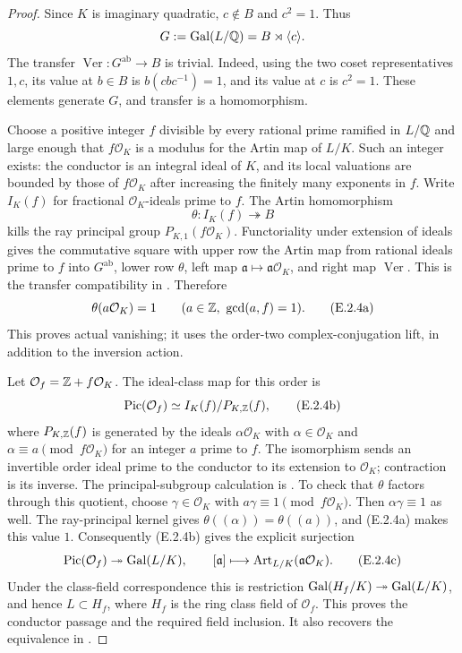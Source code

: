 \begin{proof}
Since $K$ is imaginary quadratic, $c\notin B$ and $c^2=1$. Thus
\[
 G:=\operatorname{Gal}(L/\mathbb Q)=B\rtimes\langle c\rangle.
\]
The transfer $\operatorname{Ver}:G^{\mathrm{ab}}\to B$ is trivial. Indeed, using the two coset representatives $1,c$, its value at $b\in B$ is $b(cbc^{-1})=1$, and its value at $c$ is $c^2=1$. These elements generate $G$, and transfer is a homomorphism.

Choose a positive integer $f$ divisible by every rational prime ramified in $L/\mathbb Q$ and large enough that $f\mathcal O_K$ is a modulus for the Artin map of $L/K$. Such an integer exists: the conductor is an integral ideal of $K$, and its local valuations are bounded by those of $f\mathcal O_K$ after increasing the finitely many exponents in $f$. Write $I_K(f)$ for fractional $\mathcal O_K$-ideals prime to $f$. The Artin homomorphism
\[
 \theta:I_K(f)\twoheadrightarrow B
\]
kills the ray principal group $P_{K,1}(f\mathcal O_K)$. Functoriality under extension of ideals gives the commutative square with upper row the Artin map from rational ideals prime to $f$ into $G^{\mathrm{ab}}$, lower row $\theta$, left map $\mathfrak a\mapsto\mathfrak a\mathcal O_K$, and right map $\operatorname{Ver}$. This is the transfer compatibility in \cite[Chapter V, Section 3, Proposition 3.18 and the adjoining Artin-map diagram, p.~162]{GenMilneCFT2020}. Therefore
\[
 \theta(a\mathcal O_K)=1
       \qquad(a\in\mathbb Z,\ \gcd(a,f)=1).
 \tag{E.2.4a}
\]
This proves actual vanishing; it uses the order-two complex-conjugation lift, in addition to the inversion action.

Let $\mathcal O_f=\mathbb Z+f\mathcal O_K$. The ideal-class map for this order is
\[
 \operatorname{Pic}(\mathcal O_f)
    \simeq I_K(f)/P_{K,\mathbb Z}(f),
 \tag{E.2.4b}
\]
where $P_{K,\mathbb Z}(f)$ is generated by the ideals $\alpha\mathcal O_K$ with $\alpha\in\mathcal O_K$ and $\alpha\equiv a\pmod{f\mathcal O_K}$ for an integer $a$ prime to $f$. The isomorphism sends an invertible order ideal prime to the conductor to its extension to $\mathcal O_K$; contraction is its inverse. The principal-subgroup calculation is \cite[Proposition 7.22, pp.~145--146]{GenCox1989}. To check that $\theta$ factors through this quotient, choose $\gamma\in\mathcal O_K$ with $a\gamma\equiv1\pmod{f\mathcal O_K}$. Then $\alpha\gamma\equiv1$ as well. The ray-principal kernel gives $\theta((\alpha))=\theta((a))$, and (E.2.4a) makes this value $1$. Consequently (E.2.4b) gives the explicit surjection
\[
 \operatorname{Pic}(\mathcal O_f)\twoheadrightarrow\operatorname{Gal}(L/K),
 \qquad [\mathfrak a]\longmapsto
         \operatorname{Art}_{L/K}(\mathfrak a\mathcal O_K).
 \tag{E.2.4c}
\]
Under the class-field correspondence this is restriction
$\operatorname{Gal}(H_f/K)\twoheadrightarrow\operatorname{Gal}(L/K)$, and hence $L\subset H_f$, where $H_f$ is the ring class field of $\mathcal O_f$. This proves the conductor passage and the required field inclusion. It also recovers the equivalence in \cite[Theorem 9.18 and its proof, pp.~190--192]{GenCox1989}.


\end{proof}
